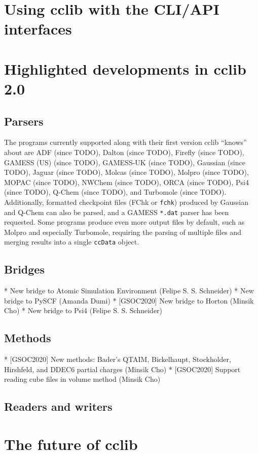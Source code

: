 \documentclass[num-refs]{wiley-article}
\begin{document}
\section{Using cclib with the CLI/API interfaces}

\section{Highlighted developments in cclib 2.0}
\subsection{Parsers}

The programs currently supported along with their first version cclib ``knows'' about are ADF (since TODO), Dalton (since TODO), Firefly (since TODO), GAMESS (US) (since TODO), GAMESS-UK (since TODO), Gaussian (since TODO), Jaguar (since TODO), Molcas (since TODO), Molpro (since TODO), MOPAC (since TODO), NWChem (since TODO), ORCA (since TODO), Psi4 (since TODO), Q-Chem (since TODO), and Turbomole (since TODO).  Additionally, formatted checkpoint files (FChk or \texttt{fchk}) produced by Gaussian and Q-Chem can also be parsed, and a GAMESS \texttt{*.dat} parser has been requested.  Some programs produce even more output files by default, such as Molpro and especially Turbomole, requiring the parsing of multiple files and merging results into a single \texttt{ccData} object.

\subsection{Bridges}
    * New bridge to Atomic Simulation Environment (Felipe S. S. Schneider)
    * New bridge to PySCF (Amanda Dumi)
    * [GSOC2020] New bridge to Horton (Minsik Cho)
    * New bridge to Psi4 (Felipe S. S. Schneider)
\subsection{Methods}

    * [GSOC2020] New methods: Bader's QTAIM, Bickelhaupt, Stockholder, Hirshfeld, and DDEC6 partial charges (Minsik Cho)
    * [GSOC2020] Support reading cube files in volume method (Minsik Cho)

\subsection{Readers and writers}


\section{The future of cclib}
\end{document}
